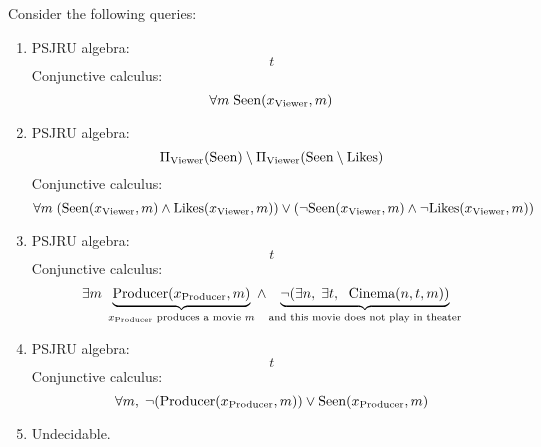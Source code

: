 \documentclass{../../cs-classes/cs-classes}
\newcommand*{\cinema}{\textnormal{Cinema}}
\newcommand*{\seen}{\textnormal{Seen}}
\newcommand*{\likes}{\textnormal{Likes}}
\newcommand*{\producer}{\textnormal{Producer}}
\newcommand*{\viewer}{\textnormal{Viewer}}
\begin{document}
\begin{exercise}
    Consider the following queries:
  \begin{enumerate}
    \item PSJRU algebra:
    \begin{equation*}
        t
    \end{equation*}
    Conjunctive calculus:
    \begin{equation*}
        \forall m \; \seen(x_{\viewer}, m)
    \end{equation*}
    
    \item PSJRU algebra:
    \begin{equation*}
        \Pi_{\viewer}(\seen)\setminus\Pi_{\viewer}(\seen\setminus\likes)
    \end{equation*}
    Conjunctive calculus:
    \begin{equation*}
        \forall m \; (\seen(x_{\viewer}, m)\land \likes(x_{\viewer}, m)) \lor (\lnot \seen(x_{\viewer}, m) \land \lnot \likes(x_{\viewer}, m))
    \end{equation*}
    
    \item PSJRU algebra:
    \begin{equation*}
        t
    \end{equation*}
    Conjunctive calculus:
    \begin{equation*}
        \exists m \; \underbrace{\producer(x_{\producer}, m)}_{x_{\producer} \textnormal{ produces a movie } m} \land \underbrace{\lnot(\exists n, \; \exists t, \; \cinema(n, t, m))}_{\textnormal{and this movie does not play in theater}}
    \end{equation*}
    
    \item PSJRU algebra:
    \begin{equation*}
        t
    \end{equation*}
    Conjunctive calculus:
    \begin{equation*}
        \forall m, \; \lnot(\producer(x_{\producer}, m)) \lor \seen(x_{\producer}, m)
    \end{equation*}
    
    \item Undecidable.

  \end{enumerate}  
\end{exercise}
\end{document}
